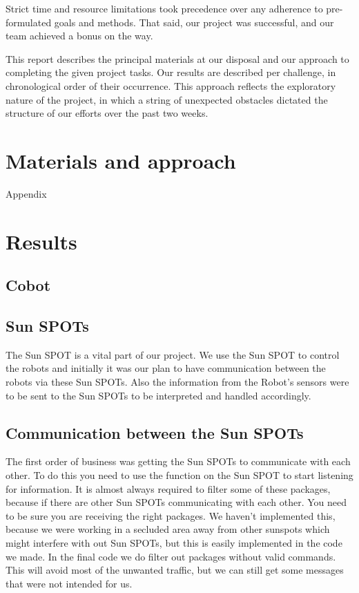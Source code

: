 \documentclass[a4paper,10pt]{article} %
\begin{document}
Strict time and resource limitations took precedence over any adherence
to pre-formulated goals and methods. That said, our project was successful,
and our team achieved a bonus on the way.

This report describes the principal materials at our disposal and our approach
to completing the given project tasks. Our results are described per challenge,
in chronological order of their occurrence. This approach reflects the
exploratory nature of the project, in which a string of unexpected obstacles
dictated the structure of our efforts over the past two weeks.


\section{Materials and approach} %

Appendix


\section{Results} %

\subsection{Cobot} %


\subsection{Sun SPOTs} %
\label{sec:sunspot}

The Sun SPOT is a vital part of our project. We use the Sun SPOT to control the
robots and initially it was our plan to have communication between the robots
via these Sun SPOTs. Also the information from the Robot's sensors were to be
sent to the Sun SPOTs to be interpreted and handled accordingly.


\subsection{Communication between the Sun SPOTs} %
\label{subsec:comm}

The first order of business was getting the Sun SPOTs to communicate with each
other. To do this you need to use the function on the Sun SPOT to start
listening for information. It is almost always required to filter some of these
packages, because if there are other Sun SPOTs communicating with each other.
You need to be sure you are receiving the right packages. We haven't implemented
this, because we were working in a secluded area away from other sunspots which
might interfere with out Sun SPOTs, but this is easily implemented in the code
we made. In the final code we do filter out packages without valid commands.
This will avoid most of the unwanted traffic, but we can still get some messages
that were not intended for us. \\
\end{document}

